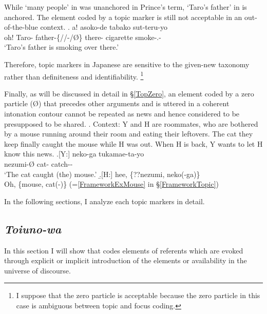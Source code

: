 While  `many people' in \Last was unanchored in Prince's term,
 `Taro's father' in \Next is anchored.
The element coded by a topic marker is still not acceptable in an out-of-the-blue context.
%
\exg. a!   asoko-de tabako sut-teru-yo \\
 oh! Taro- father-\{//-/{\O}\} there- cigarette smoke-.- \\
 `Taro's father is smoking over there.'

Therefore, topic markers in Japanese are sensitive to the given-new taxonomy rather than definiteness and identifiability.%
 \footnote{
 I suppose that the zero particle is acceptable
 because the zero particle in this case is ambiguous between topic and focus coding.
 }

Finally, as will be discussed in detail in \S \ref{TopZero},
an element coded by a zero particle ({\O}) that precedes other arguments and is uttered in a coherent intonation contour
cannot be repeated as news and hence considered to be presupposed to be shared.
\ex. \label{mouse}Context: Y and H are roommates,
	who are bothered by a mouse running around their room
	and eating their leftovers.
	The cat they keep finally caught the mouse while H was out.
	When H is back, Y wants to let H know this news.
	\ag.[Y:]  neko-ga tukamae-ta-yo \\
		nezumi-{\O} cat- catch-- \\
		`The cat caught (the) mouse.'
	\b.[H:] hee, \{??nezumi, neko(-ga)\} \\
	  Oh, \{mouse, cat(-)\}
	  \hfill{(=\ref{FrameworkExMouse} in \S \ref{FrameworkTopic})}


In the following sections,
I analyze each topic markers in detail.

\subsection{\textit{Toiuno-wa}}\label{Toiunowa}

In this section
I will show that  codes elements of referents
which are evoked
through explicit or implicit introduction of the elements or
availability in the universe of discourse.

